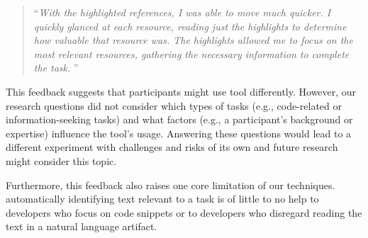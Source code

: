 \begin{footnotesize}
\begin{quote}
    ``\textit{With the highlighted references, I was able to move much quicker. I quickly glanced at each resource, reading just the highlights to determine how valuable that resource was. The highlights allowed me to focus on the most relevant resources, gathering the necessary information to complete the task. 
}''
\end{quote}
\end{footnotesize}





\smallskip
This feedback suggests that participants  might use \acs{tool} differently. However, 
our research questions did not consider which types of tasks (e.g., code-related or information-seeking tasks)
and what factors (e.g., a participant's background or expertise)  influence the tool's usage.
Answering these questions would lead to a different experiment with challenges and risks of its own
and future research might consider this topic.



Furthermore, this feedback also raises one core limitation of our techniques. 
automatically identifying text relevant to a task is of little to no help
to developers who focus on code snippets or to developers who disregard 
reading the text in a natural language artifact.


















